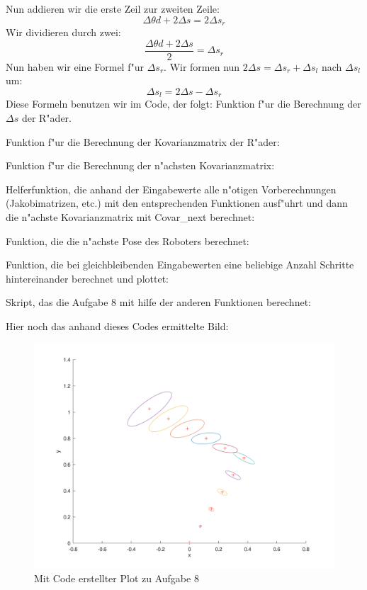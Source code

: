 \documentclass[11pt]{article}
\begin{document}
    Nun addieren wir die erste Zeil zur zweiten Zeile:
    \begin{equation}
        \Delta \theta d + 2\Delta s = 2\Delta s_{r}
    \end{equation}
    Wir dividieren durch zwei:
    \begin{equation}
        \frac{\Delta \theta d + 2\Delta s}{2} = \Delta s_{r}
    \end{equation}
    Nun haben wir eine Formel f"ur $\Delta s_{r}$.
    Wir formen nun $2\Delta s = \Delta s_{r} + \Delta s_{l}$ nach $\Delta s_{l}$ um:
    \begin{equation}
        \Delta s_{l} = 2\Delta s - \Delta s_{r}
    \end{equation}
    Diese Formeln benutzen wir im Code, der folgt:
    Funktion f"ur die Berechnung der $\Delta s$ der R"ader.
    

    Funktion f"ur die Berechnung der Kovarianzmatrix der R"ader:
    
    Funktion f"ur die Berechnung der n"achsten Kovarianzmatrix:
    
    Helferfunktion, die anhand der Eingabewerte alle n"otigen Vorberechnungen (Jakobimatrizen, etc.) mit den entsprechenden Funktionen ausf"uhrt und dann die n"achste Kovarianzmatrix mit Covar\_next berechnet:
    
    Funktion, die die n"achste Pose des Roboters berechnet:
    
    Funktion, die bei gleichbleibenden Eingabewerten eine beliebige Anzahl Schritte hintereinander berechnet und plottet:
    
    Skript, das die Aufgabe 8 mit hilfe der anderen Funktionen berechnet:
    
    Hier noch das anhand dieses Codes ermittelte Bild:
    \begin{figure}[H]
        \centering
        \includegraphics[width=15cm]{task8.png}
        \caption{Mit Code erstellter Plot zu Aufgabe 8}
        \label{fig:result}
    \end{figure}
\end{document}
